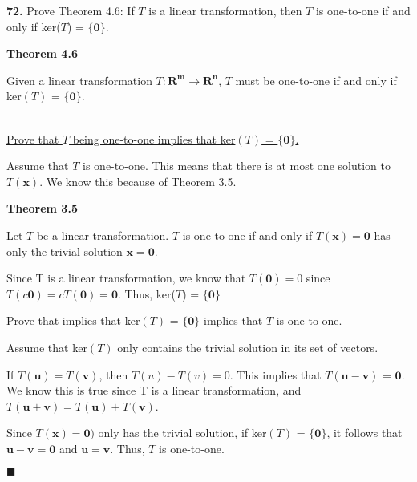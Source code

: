 \documentclass[12pt]{article}
\renewcommand{\vec}[1]{\mathbf{#1}}
\begin{document}
\pagebreak
\textbf{72.} Prove Theorem 4.6: If $T$ is a linear transformation, then $T$ is one-to-one if and only if ker($T$) = $\{\vec{0}\}$.

\begin{lin-proof}

\begin{elaboration}
\textbf{Theorem 4.6}

Given a linear transformation $T: \vec{R^{m}} \rightarrow \vec{R^{n}}$, $T$ must be one-to-one if and only if ker$(T)$ = $\lbrace \vec{0} \rbrace$.

\end{elaboration} ~\\

\underline{Prove that $T$ being one-to-one implies that ker$(T)$ = $\lbrace \vec{0} \rbrace$.}

\begin{addmargin}[1em]{2em}

Assume that $T$ is one-to-one. This means that there is at most one solution to $T(\vec{x})$. We know this because of Theorem 3.5. ~\\

\begin{elaboration}
\textbf{Theorem 3.5}

Let $T$ be a linear transformation. $T$ is one-to-one if and only if $T(\vec{x}) = \vec{0}$ has only the trivial solution $\vec{x} = \vec{0}$.

\end{elaboration}

Since T is a linear transformation, we know that $T(\vec{0}) = 0$ since $T(c\vec{0}) = cT(\vec{0}) = \vec{0}$.
Thus, ker($T$) = $\lbrace \vec{0} \rbrace$~\\

\end{addmargin}


\underline{Prove that  implies that ker$(T)$ = $\lbrace \vec{0} \rbrace$ implies that $T$ is one-to-one.}

\begin{addmargin}[1em]{2em}

Assume that ker$(T)$ only contains the trivial solution in its set of vectors.

If $T(\vec{u}) = T(\vec{v})$, then $T(u) - T(v) = 0$.
This implies that $T(\vec{u} - \vec{v})$ = $\vec{0}$. We know this is true since T is a linear transformation, and  $T(\vec{u} + \vec{v}) = T(\vec{u}) + T(\vec{v})$.


Since $T(\vec{x}) = \vec{0})$ only has the trivial solution, if ker$(T)$ = $\lbrace \vec{0} \rbrace$, it follows that $\vec{u - v} = \vec{0}$ and $\vec{u} = \vec{v}$. Thus, $T$ is one-to-one.


\end{addmargin}

 \begin{flushright}$\blacksquare$ \end{flushright}
\end{lin-proof}
\end{document}
